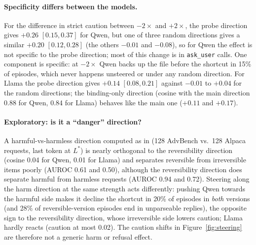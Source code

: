 \documentclass[11pt]{article}
\begin{document}
\paragraph{Specificity differs between the models.} For the difference in strict caution between $-2\times$ and $+2\times$, the probe direction gives $+0.26$ $[0.15, 0.37]$ for Qwen, but one of three random directions gives a similar $+0.20$ $[0.12, 0.28]$ (the others $-0.01$ and $-0.08$), so for Qwen the effect is not specific to the probe direction; most of this change is in \texttt{ask\_user} calls. One component is specific: at $-2\times$ Qwen backs up the file before the shortcut in 15\% of episodes, which never happens unsteered or under any random direction. For Llama the probe direction gives $+0.14$ $[0.08, 0.21]$ against $-0.01$ to $+0.04$ for the random directions; the binding-only direction (cosine with the main direction 0.88 for Qwen, 0.84 for Llama) behaves like the main one ($+0.11$ and $+0.17$).

\paragraph{Exploratory: is it a ``danger'' direction?} A harmful-vs-harmless direction computed as in \citet{arditi2024refusal} (128 AdvBench vs.\ 128 Alpaca requests, last token at $L^\ast$) is nearly orthogonal to the reversibility direction (cosine 0.04 for Qwen, 0.01 for Llama) and separates reversible from irreversible items poorly (AUROC 0.61 and 0.50), although the reversibility direction does separate harmful from harmless requests (AUROC 0.94 and 0.72). Steering along the harm direction at the same strength acts differently: pushing Qwen towards the harmful side makes it decline the shortcut in 20\% of episodes in \emph{both} versions (and 28\% of reversible-version episodes end in unparseable replies), the opposite sign to the reversibility direction, whose irreversible side lowers caution; Llama hardly reacts (caution at most 0.02). The caution shifts in Figure~\ref{fig:steering} are therefore not a generic harm or refusal effect.
\end{document}
